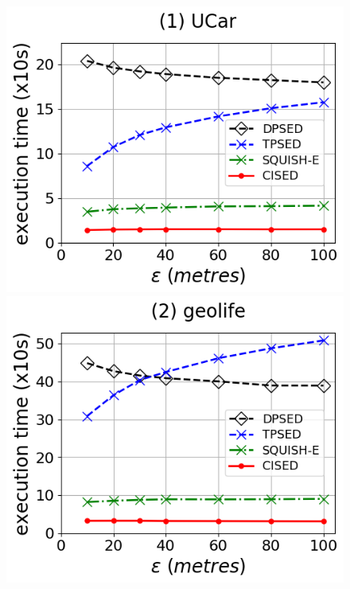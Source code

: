 \begin{figure}[tb!]
	\centering
	\includegraphics[scale=0.315]{Figures/Exp-SED-time-epsilon-service.png}	\hspace{1ex}
	\includegraphics[scale=0.315]{Figures/Exp-SED-time-epsilon-geolife.png}	\hspace{1ex}

\end{figure}
